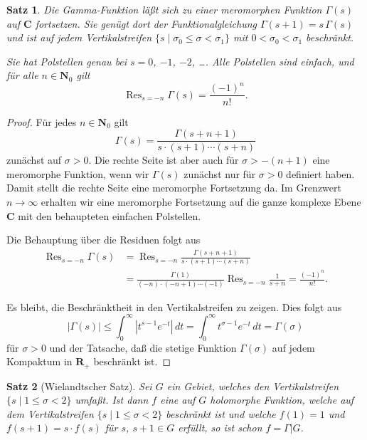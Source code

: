 \documentclass[a4paper,twoside,openright]{report}
\newtheorem{thm}{Satz}[chapter]
\theoremstyle{definition}
\theoremstyle{remark}
\DeclareMathOperator{\Res}{Res}
\begin{document}
\begin{thm}
  \label{thm:gamma}
  Die Gamma-Funktion läßt sich zu einer meromorphen Funktion $\Gamma(s)$
  auf $\mathbf C$ fortsetzen. Sie genügt dort der Funktionalgleichung
  $\Gamma(s + 1) = s \, \Gamma(s)$ und ist auf jedem Vertikalstreifen
  $\{s \mid \sigma_0 \leq \sigma < \sigma_1\}$ mit $0 < \sigma_0 < \sigma_1$
  beschränkt.
  
  Sie hat Polstellen genau bei $s = 0$, $-1$, $-2$,
  \dots. Alle Polstellen sind einfach, und für alle $n \in \mathbf N_0$ gilt
  \[
    \Res_{s = -n} \Gamma(s) = \frac{(-1)^n}{n!}.
  \]
\end{thm}

\begin{proof}
  Für jedes $n \in \mathbf N_0$ gilt
  \[
    \Gamma(s) = \frac{\Gamma(s + n + 1)}{s \cdot (s + 1) \dotsm (s + n)}
  \]
  zunächst auf $\sigma > 0$. Die rechte Seite ist aber auch für $\sigma > - (n + 1)$
  eine meromorphe Funktion, wenn wir $\Gamma(s)$ zunächst nur für $\sigma > 0$
  definiert haben. Damit stellt die rechte Seite eine meromorphe Fortsetzung
  da. Im Grenzwert $n \to \infty$ erhalten wir eine meromorphe Fortsetzung auf
  die ganze komplexe Ebene $\mathbf C$ mit den behaupteten einfachen Polstellen.
  
  Die Behauptung über die Residuen folgt aus
  \[
    \begin{split}
      \Res_{s = -n} \Gamma(s)
      & = \Res_{s = -n} \frac{\Gamma(s + n + 1)}{s \cdot (s + 1) \dotsm (s + n)}
      \\
      &= \frac{\Gamma(1)}{(-n) \cdot (-n + 1) \dotsm (-1)} \Res_{s = -n} \frac 1 {s + n}
      = \frac{(-1)^n}{n!}.
    \end{split}
  \]
  
  Es bleibt, die Beschränktheit in den Vertikalstreifen zu zeigen. Dies folgt
  aus
  \[
    |\Gamma(s)| \leq \int_0^\infty |t^{s - 1} e^{-t}| \, dt =  \int_0^\infty t^{\sigma - 1} e^{-t} \, dt
    = \Gamma(\sigma)
  \]
  für $\sigma > 0$ und der Tatsache, daß die stetige Funktion $\Gamma(\sigma)$ auf
  jedem Kompaktum in $\mathbf R_+$ beschränkt ist.
\end{proof}

\begin{thm}[Wielandtscher Satz]
  Sei $G$ ein Gebiet, welches den Vertikalstreifen $\{s \mid 1 \leq \sigma < 2\}$
  umfaßt. Ist dann $f$ eine auf $G$ holomorphe Funktion, welche auf dem
  Vertikalstreifen $\{s \mid 1 \leq \sigma < 2\}$ beschränkt ist und welche
  $f(1) = 1$ und $f(s + 1) = s \cdot f(s)$ für $s$, $s + 1 \in G$ erfüllt, so
  ist schon $f = \Gamma|G$.
\end{thm}
\end{document}
